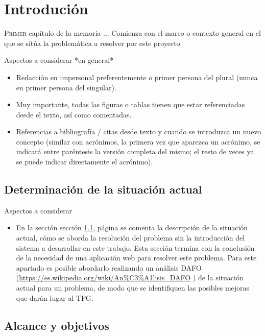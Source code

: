 \chapter{Introdución}
\label{chap:introducion}

\lettrine{P}{rimer} capítulo de la memoria ... Comienza con el marco o contexto general en el que se sitúa la problemática a resolver por este proyecto. 

{ \color{red} Aspectos a considerar *en general*
    \begin{itemize}
      \item Redacción en impersonal preferentemente o primer persona del plural (nunca en primer persona del singular).
      \item Muy importante, todas las figuras o tablas tienen que estar referenciadas desde el texto, así como comentadas.
      \item Referencias a bibliografía / citas desde texto y cuando se introduzca un nuevo concepto (similar con acrónimos, la primera vez que aparezca un acrónimo, se indicará entre paréntesis la versión completa del mismo; el resto de veces ya se puede indicar directamente el acrónimo).
    \end{itemize}
}

\section{Determinación de la situación actual}
\label{sec:actual}

{ \color{red} Aspectos a considerar
    \begin{itemize}
      \item En la sección sección \ref{sec:actual}, página \pageref{sec:actual} se comenta la descripción de la situación actual, cómo se aborda la resolución del problema sin la introducción del sistema a desarrollar en este trabajo. Esta sección termina con la conclusión de la necesidad de una aplicación web para resolver este problema. Para este apartado es posible abordarlo realizando un análisis DAFO (\url{https://es.wikipedia.org/wiki/An%C3%A1lisis_DAFO} ) de la situación actual para un problema, de modo que se identifiquen las posibles mejoras que darán lugar al TFG.
    \end{itemize}
}

\section{Alcance y objetivos}
\label{sec:objetivos}

